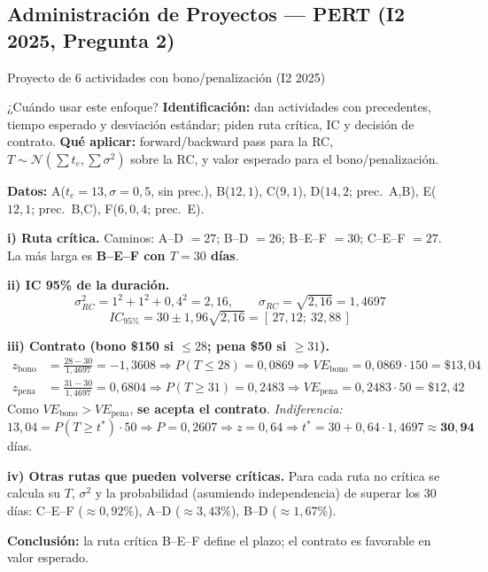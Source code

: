 \subsection[Proyectos: PERT (I2 2025)]{Administración de Proyectos --- PERT (I2 2025, Pregunta 2)}

\begin{ejercicio}{Proyecto de 6 actividades con bono/penalización (I2 2025)}

\begin{tipprueba}{¿Cuándo usar este enfoque?}
\textbf{Identificación:} dan actividades con precedentes, tiempo esperado y desviación estándar; piden ruta crítica, IC y decisión de contrato. \textbf{Qué aplicar:} forward/backward pass para la RC, $T\sim\mathcal{N}(\sum t_e, \sum\sigma^2)$ sobre la RC, y valor esperado para el bono/penalización.
\end{tipprueba}

\textbf{Datos:} A($t_e{=}13,\sigma{=}0{,}5$, sin prec.), B($12,1$), C($9,1$), D($14,2$; prec.\ A,B), E($12,1$; prec.\ B,C), F($6,0{,}4$; prec.\ E).

\textbf{i) Ruta crítica.} Caminos: A--D $= 27$; B--D $= 26$; B--E--F $= 30$; C--E--F $= 27$. La más larga es \textbf{B--E--F con $T = 30$ días}.

\textbf{ii) IC 95\% de la duración.}
\[
  \sigma_{RC}^2 = 1^2 + 1^2 + 0{,}4^2 = 2{,}16, \qquad \sigma_{RC} = \sqrt{2{,}16} = 1{,}4697
\]
\[
  IC_{95\%} = 30 \pm 1{,}96\sqrt{2{,}16} = [\,27{,}12;\ 32{,}88\,]
\]

\textbf{iii) Contrato (bono \$150 si $\le 28$; pena \$50 si $\ge 31$).}
\begin{align*}
  z_{\text{bono}} &= \tfrac{28-30}{1{,}4697} = -1{,}3608 \Rightarrow P(T\le28)=0{,}0869 \Rightarrow VE_{\text{bono}} = 0{,}0869\cdot150 = \$13{,}04\\
  z_{\text{pena}} &= \tfrac{31-30}{1{,}4697} = 0{,}6804 \Rightarrow P(T\ge31)=0{,}2483 \Rightarrow VE_{\text{pena}} = 0{,}2483\cdot50 = \$12{,}42
\end{align*}
Como $VE_{\text{bono}} > VE_{\text{pena}}$, \textbf{se acepta el contrato}.
\emph{Indiferencia:} $13{,}04 = P(T\ge t^*) \cdot 50 \Rightarrow P = 0{,}2607 \Rightarrow z = 0{,}64 \Rightarrow t^* = 30 + 0{,}64\cdot1{,}4697 \approx \mathbf{30{,}94}$ días.

\textbf{iv) Otras rutas que pueden volverse críticas.} Para cada ruta no crítica se calcula su $T$, $\sigma^2$ y la probabilidad (asumiendo independencia) de superar los 30 días: C--E--F ($\approx0{,}92\%$), A--D ($\approx3{,}43\%$), B--D ($\approx1{,}67\%$).

\textbf{Conclusión:} la ruta crítica B--E--F define el plazo; el contrato es favorable en valor esperado.
\end{ejercicio}


